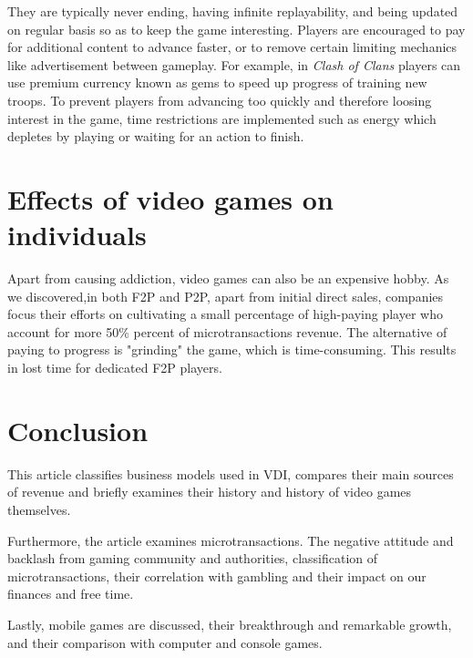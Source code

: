 \documentclass[10pt,british,a4paper,titlepage]{article}
\begin{document}
They are typically never ending, having infinite replayability, and being updated on regular basis so as to keep the game interesting. Players are encouraged to pay for additional content to advance faster, or to remove certain limiting mechanics like advertisement between gameplay. For example, in \emph{Clash of Clans} players can use premium currency known as gems to speed up progress of training new troops. To prevent players from advancing too quickly and therefore loosing interest in the game, time restrictions are implemented such as energy which depletes by playing or waiting for an action to finish\cite{mayra2020mobile:mob}. 

\section{Effects of video games on individuals}

Apart from causing addiction, video games can also be an expensive hobby. As we discovered,in both F2P and P2P, apart from initial direct sales, companies focus their efforts on cultivating a small percentage of high-paying player who account for more 50\% percent of microtransactions revenue. The alternative of paying to progress is "grinding" the game, which is time-consuming. This results in lost time for dedicated F2P players.   


\section{Conclusion}

This article classifies business models used in VDI, compares their main sources of revenue and briefly examines their history and history of video games themselves. 

Furthermore, the article examines microtransactions. The negative attitude and backlash from gaming community and authorities, classification of microtransactions, their correlation with gambling and their impact on our finances and free time.  

Lastly, mobile games are discussed, their breakthrough and remarkable growth, and their comparison with computer and console games.   






\end{document}
